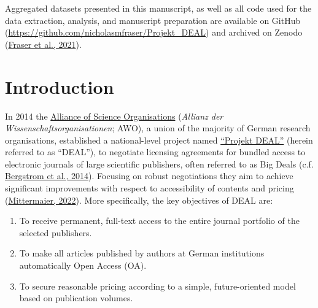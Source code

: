 \documentclass[
]{article}
\providecommand{\tightlist}{%
  \setlength{\itemsep}{0pt}\setlength{\parskip}{0pt}}
\begin{document}
Aggregated datasets presented in this manuscript, as well as all code used for the data extraction, analysis, and manuscript preparation are available on GitHub (\url{https://github.com/nicholasmfraser/Projekt_DEAL}) and archived on Zenodo (\href{https://doi.org/10.5281/zenodo.4771575}{Fraser et al., 2021}).

\pagebreak

\hypertarget{introduction}{%
\section{Introduction}\label{introduction}}

In 2014 the \href{https://wissenschaftsfreiheit.de/}{Alliance of Science Organisations} (\emph{Allianz der Wissenschaftsorganisationen}; AWO), a union of the majority of German research organisations, established a national-level project named \href{https://www.projekt-deal.de}{``Projekt DEAL''} (herein referred to as ``DEAL''), to negotiate licensing agreements for bundled access to electronic journals of large scientific publishers, often referred to as Big Deals (c.f. \href{https://doi.org/10.1073/pnas.1403006111}{Bergstrom et al., 2014}). Focusing on robust negotiations they aim to achieve significant improvements with respect to accessibility of contents and pricing (\href{http://hdl.handle.net/2128/31158}{Mittermaier, 2022}). More specifically, the key objectives of DEAL are:

\begin{enumerate}
\def\labelenumi{\arabic{enumi}.}
\tightlist
\item
  To receive permanent, full-text access to the entire journal portfolio of the selected publishers.
\item
  To make all articles published by authors at German institutions automatically Open Access (OA).
\item
  To secure reasonable pricing according to a simple, future-oriented model based on publication volumes.
\end{enumerate}
\end{document}
